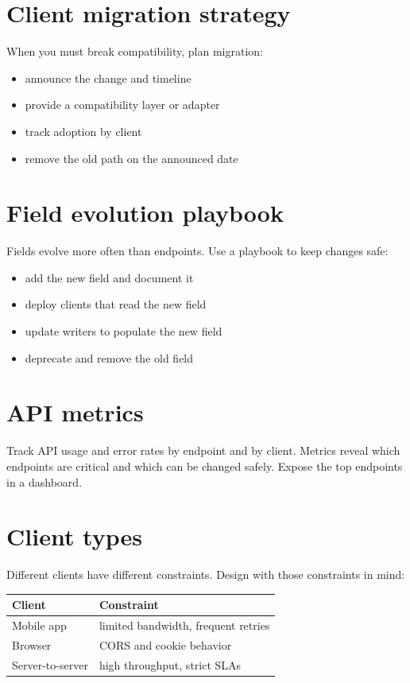 \section{Client migration strategy}
When you must break compatibility, plan migration:
\begin{itemize}[nosep]
  \item announce the change and timeline
  \item provide a compatibility layer or adapter
  \item track adoption by client
  \item remove the old path on the announced date
\end{itemize}

\section{Field evolution playbook}
Fields evolve more often than endpoints.
Use a playbook to keep changes safe:
\begin{itemize}[nosep]
  \item add the new field and document it
  \item deploy clients that read the new field
  \item update writers to populate the new field
  \item deprecate and remove the old field
\end{itemize}

\section{API metrics}
Track API usage and error rates by endpoint and by client.
Metrics reveal which endpoints are critical and which can be changed safely.
Expose the top endpoints in a dashboard.

\section{Client types}
Different clients have different constraints.
Design with those constraints in mind:

\begin{tabularx}{\textwidth}{@{}lX@{}}
\toprule
Client & Constraint \\
\midrule
Mobile app & limited bandwidth, frequent retries \\
Browser & CORS and cookie behavior \\
Server-to-server & high throughput, strict SLAs \\
\bottomrule
\end{tabularx}


